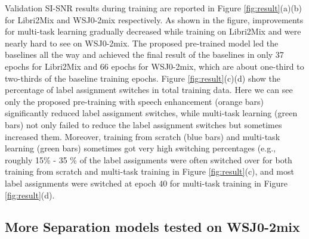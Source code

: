 \documentclass[a4paper]{article}
\begin{document}
Validation SI-SNR results during training are reported in Figure \ref{fig:result}(a)(b) for Libri2Mix and WSJ0-2mix respectively.
As shown in the figure, improvements for multi-task learning gradually decreased while training on Libri2Mix and were nearly hard to see on WSJ0-2mix.
The proposed pre-trained model led the baselines all the way and achieved the final result of the baselines in only 37 epochs for Libri2Mix and 66 epochs for WSJ0-2mix, which are about one-third to two-thirds of the baseline training epochs.
Figure \ref{fig:result}(c)(d) show the percentage of label assignment switches in total training data.
Here we can see only the proposed pre-training with speech enhancement (orange bars) significantly reduced label assignment switches, while multi-task learning (green bars) not only failed to reduce the label assignment switches but sometimes increased them.
Moreover, training from scratch (blue bars) and multi-task learning (green bars) sometimes got very high switching percentages (e.g., roughly 15\% - 35 \% of the label assignments were often switched over for both training from scratch and multi-task training in Figure \ref{fig:result}(c), and most label assignments were switched at epoch 40 for multi-task training in Figure \ref{fig:result}(d).



\subsection{More Separation models tested on WSJ0-2mix}
\label{ssec:wsj0-result}

\end{document}
